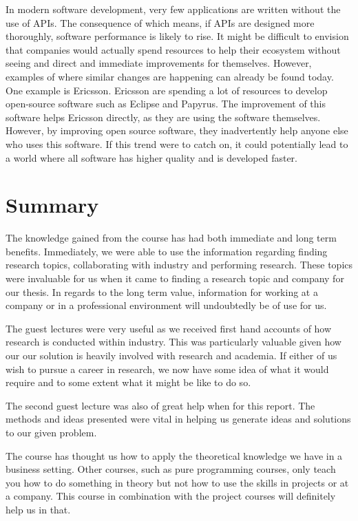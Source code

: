 \documentclass{article}
\begin{document}
In modern software development, very few applications are written without the use of APIs. The consequence of which means, if APIs are designed more thoroughly, software performance is likely to rise. It might be difficult to envision that companies would actually spend resources to help their ecosystem without seeing and direct and immediate improvements for themselves. However, examples of where similar changes are happening can already be found today. One example is Ericsson. Ericsson are spending a lot of resources to develop open-source software such as Eclipse and Papyrus. The improvement of this software helps Ericsson directly, as they are using the software themselves. However, by improving open source software, they inadvertently help anyone else who uses this software. If this trend were to catch on, it could potentially lead to a world where all software has higher quality and is developed faster. 

\section{Summary}
The knowledge gained from the course has had both immediate and long term benefits. Immediately, we were able to use the information regarding finding research topics, collaborating with industry and performing research. These topics were invaluable for us when it came to finding a research topic and company for our thesis. In regards to the long term value, information for working at a company or in a professional environment will undoubtedly be of use for us. 

The guest lectures were very useful as we received first hand accounts of how research is conducted within industry. This was particularly valuable given how our our solution is heavily involved with research and academia. If either of us wish to pursue a career in research, we now have some idea of what it would require and to some extent what it might be like to do so.

The second guest lecture was also of great help when for this report. The methods and ideas presented were vital in helping us generate ideas and solutions to our given problem.

The course has thought us how to apply the theoretical knowledge we have in a business setting. Other courses, such as pure programming courses, only teach you how to do something in theory but not how to use the skills in projects or at a company. This course in combination with the project courses will definitely help us in that. 
\end{document}
